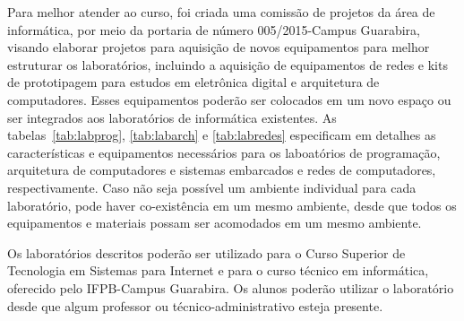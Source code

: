 	Para melhor atender ao curso, foi criada uma comissão de projetos da área de informática, por meio da portaria de número 005/2015-Campus Guarabira, visando elaborar projetos para aquisição de novos equipamentos para melhor estruturar os laboratórios, incluindo a aquisição de equipamentos de redes e kits de prototipagem para estudos em eletrônica digital e arquitetura de computadores. Esses equipamentos poderão ser colocados em um novo espaço ou ser integrados aos laboratórios de informática existentes. As tabelas~\ref{tab:labprog}, \ref{tab:labarch} e \ref{tab:labredes} especificam em detalhes as características e equipamentos necessários para os laboatórios de programação, arquitetura de computadores e sistemas embarcados e redes de computadores, respectivamente. Caso não seja possível um ambiente individual para cada laboratório, pode haver co-existência em um mesmo ambiente, desde que todos os equipamentos e materiais possam ser acomodados em um mesmo ambiente.
	
	Os laboratórios descritos poderão ser utilizado para o Curso Superior de Tecnologia em Sistemas para Internet e para o curso técnico em informática, oferecido pelo IFPB-Campus Guarabira. Os alunos poderão utilizar o laboratório desde que algum professor ou técnico-administrativo esteja presente.
	
